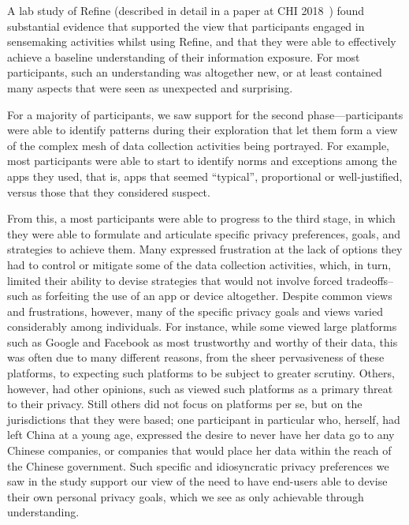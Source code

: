 \documentclass[sigchi-a, authorversion]{acmart}
\begin{document}
A lab study of Refine (described in detail in a paper at CHI 2018~\cite{refine}) 
found substantial evidence that supported the view that participants engaged in
sensemaking activities whilst using Refine, and that they were able to effectively 
achieve a baseline understanding of their information exposure.  For most participants,
such an understanding was altogether new, or at least contained many aspects that were
seen as unexpected and surprising.  

For a majority of participants, we saw support for the second phase---participants were able
to identify patterns during their exploration that let them form a view of the complex
mesh of data collection activities being portrayed.  For example, most participants were able
to start to identify norms and exceptions among the apps they used, that is, apps that seemed
``typical'',  proportional or well-justified, versus those that they considered suspect.  

From this, a most participants were able to progress to the third stage, in which they were 
able to formulate and articulate specific privacy preferences, goals, and strategies to 
achieve them. Many expressed frustration at the lack of options they had to control or 
mitigate some of the data collection activities, which, in turn, limited their ability 
to devise strategies that would not involve forced tradeoffs--such as forfeiting the use of 
an app or device altogether. Despite common views and frustrations, however, many of the specific privacy goals and views varied considerably among individuals. For instance, while some viewed large platforms such as Google and Facebook as most trustworthy and worthy of their data, this was 
often due to many different reasons, from the sheer pervasiveness of these platforms, to expecting
such platforms to be subject to greater scrutiny.  Others, however, had other opinions, such as
viewed such platforms as a primary threat to their privacy.  Still others did not focus on platforms per se, but on the jurisdictions that they were based; one participant in particular who, herself, had left China at a young age, expressed the desire to never have her data go to any Chinese companies, or  companies that would place her data within the reach of the Chinese government.  Such specific and idiosyncratic privacy preferences we saw in the study support our view of the need to have end-users able to devise their own personal privacy goals, which we see as only achievable through understanding.

% 
% 
\end{document}
